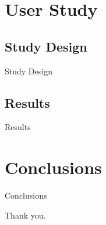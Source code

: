 \documentclass{beamer}
\begin{document}
\section{User Study}

\subsection{Study Design}

\begin{frame}{Study Design}
\end{frame}

\subsection{Results}

\begin{frame}{Results}
\end{frame}

\section{Conclusions}

\begin{frame}{Conclusions}
\end{frame}

\begin{frame}
Thank you.
\end{frame}
\end{document}
